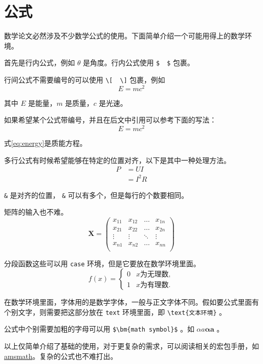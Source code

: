 \section{公式}

数学论文必然涉及不少数学公式的使用。下面简单介绍一个可能用得上的数学环境。

首先是行内公式，例如 $ \theta $ 是角度。行内公式使用 \verb|$  $| 包裹。

行间公式不需要编号的可以使用 \verb|\[  \]| 包裹，例如
\[
E=mc^2
\]

其中 $ E $ 是能量，$ m $ 是质量，$ c $ 是光速。

如果希望某个公式带编号，并且在后文中引用可以参考下面的写法：
\begin{equation}
E=mc^2
\label{eq:energy}
\end{equation}

式\cref{eq:energy}是质能方程。

多行公式有时候希望能够在特定的位置对齐，以下是其中一种处理方法。
\begin{align}
P & = UI \\
& = I^2R
\end{align}

\verb|&| 是对齐的位置， \verb|&| 可以有多个，但是每行的个数要相同。

矩阵的输入也不难。
\[
\mathbf{X} = \left(
    \begin{array}{cccc}
    x_{11} & x_{12} & \ldots & x_{1n}\\
    x_{21} & x_{22} & \ldots & x_{2n}\\
    \vdots & \vdots & \ddots & \vdots\\
    x_{n1} & x_{n2} & \ldots & x_{nn}\\
    \end{array} \right)
\]

分段函数这些可以用 \verb|case| 环境，但是它要放在数学环境里面。
\[
f(x) =
    \begin{cases}
        0 &  x \text{为无理数} ,\\
        1 &  x \text{为有理数} .
    \end{cases}
\]

在数学环境里面，字体用的是数学字体，一般与正文字体不同。假如要公式里面有个别文字，则需要把这部分放在 \verb|text| 环境里面，即 \verb|\text{文本环境}| 。

公式中个别需要加粗的字母可以用 \verb|$\bm{math symbol}$| 。如 $ \alpha a\bm{\alpha a} $ 。

以上仅简单介绍了基础的使用，对于更复杂的需求，可以阅读相关的宏包手册，如 \href{http://texdoc.net/texmf-dist/doc/latex/amsmath/amsldoc.pdf}{amsmath}。复杂的公式也不难打出。

